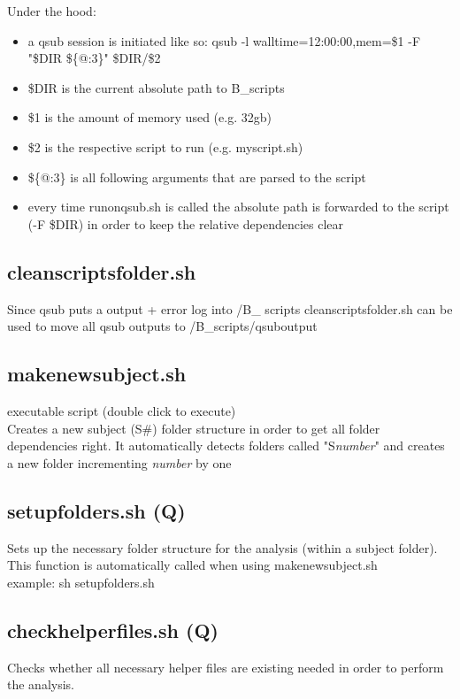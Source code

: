 \documentclass[12pt,a4paper]{scrartcl}
\begin{document}
Under the hood:
\begin{itemize}
\item a qsub session is initiated like so: qsub -l walltime=12:00:00,mem=\$1 -F "\$DIR \$\{@:3\}" \$DIR/\$2
\item \$DIR is the current absolute path to B\_scripts
\item \$1 is the amount of memory used (e.g. 32gb)
\item \$2 is the respective script to run (e.g. myscript.sh)
\item \$\{@:3\} is all following arguments that are parsed to the script
\item every time runonqsub.sh is called the absolute path is forwarded to the script (-F \$DIR) in order to keep the relative dependencies clear
\end{itemize}

\subsection{cleanscriptsfolder.sh}
Since qsub puts a output + error log into /B\_ scripts cleanscriptsfolder.sh can be used to move all qsub outputs to /B\_scripts/qsuboutput\\

\subsection{makenewsubject.sh}
executable script (double click to execute)\\

Creates a new subject (S\#) folder structure in order to get all folder dependencies right. It automatically detects folders called "S\textit{number}" and creates a new folder incrementing \textit{number} by one

\subsection{setupfolders.sh (Q)}
Sets up the necessary folder structure for the analysis (within a subject folder). This function is automatically called when using makenewsubject.sh\\

\noindent example: sh setupfolders.sh

\subsection{checkhelperfiles.sh (Q)}
Checks whether all necessary helper files are existing needed in order to perform the analysis.\\
\end{document}
